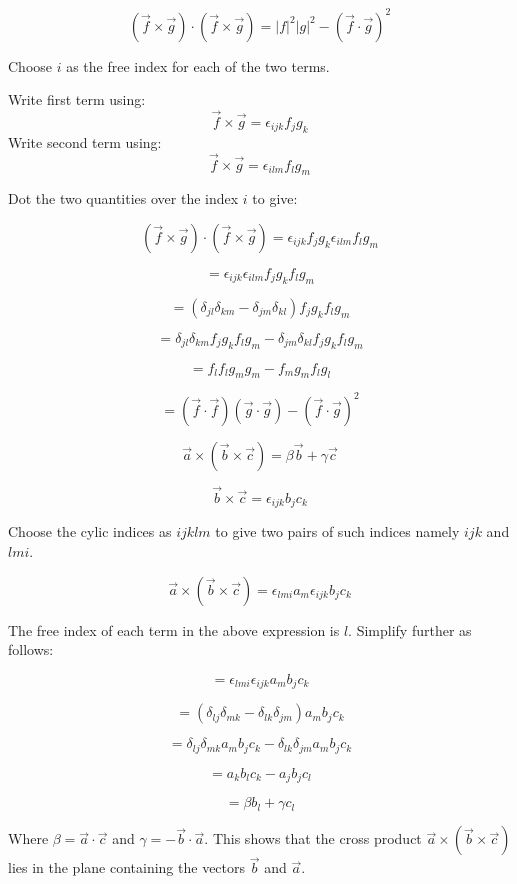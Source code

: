 \begin{question}
$$(\vec{f} \times \vec{g}) \cdot (\vec{f} \times \vec{g}) = |f|^2 |g|^2 - (\vec{f} \cdot \vec{g})^2$$
\end{question}
\begin{solution}[print]

Choose $i$ as the free index for each of the two terms.

Write first term using:
$$ \vec{f} \times \vec{g} = \epsilon_{ijk} f_j g_k $$
Write second term using:
$$ \vec{f} \times \vec{g} = \epsilon_{ilm} f_l g_m $$

Dot the two quantities over the index $i$ to give:

$$ \left( \vec{f} \times \vec{g} \right) \cdot \left( \vec{f} \times \vec{g} \right) = \epsilon_{ijk} f_j g_k \epsilon_{ilm} f_l g_m $$

$$ = \epsilon_{ijk} \epsilon_{ilm} f_j g_k f_l g_m $$

$$ = \left( \delta_{jl} \delta_{km} - \delta_{jm} \delta_{kl} \right) f_j g_k f_l g_m $$

$$ = \delta_{jl} \delta_{km} f_j g_k f_l g_m - \delta_{jm} \delta_{kl} f_j g_k f_l g_m $$

$$ = f_l f_l g_m g_m - f_m g_m f_l g_l $$

$$ = \left( \vec{f} \cdot \vec{f} \right) \left( \vec{g} \cdot \vec{g} \right) - \left( \vec{f} \cdot \vec{g} \right)^2 $$

\end{solution}


\begin{question}
$$ \vec{a} \times \left( \vec{b} \times \vec{c} \right) = \beta \vec{b} + \gamma \vec{c} $$
\end{question}
\begin{solution}[print]

$$ \vec{b} \times \vec{c} = \epsilon_{ijk} b_j c_k $$

Choose the cylic indices as $ijklm$ to give two pairs of such indices namely $ijk$ and $lmi$. 

$$ \vec{a} \times \left( \vec{b} \times \vec{c} \right) = \epsilon_{lmi} a_m \epsilon_{ijk} b_j c_k $$

The free index of each term in the above expression is $l$. Simplify further as follows:

$$ = \epsilon_{lmi} \epsilon_{ijk} a_m b_j c_k $$

$$ = \left( \delta_{lj} \delta_{mk} - \delta_{lk} \delta_{jm} \right) a_m b_j c_k $$

$$ = \delta_{lj} \delta_{mk} a_m b_j c_k - \delta_{lk} \delta_{jm} a_m b_j c_k $$

$$ = a_k b_l c_k - a_j b_j c_l$$

$$ = \beta b_l + \gamma c_l $$

Where $\beta = \vec{a} \cdot \vec{c} $ and $\gamma = - \vec{b} \cdot \vec{a}$. This shows that the cross product $\vec{a} \times \left( \vec{b} \times \vec{c} \right)$ lies in the plane containing the vectors $\vec{b}$ and $\vec{a}$.

\end{solution}

